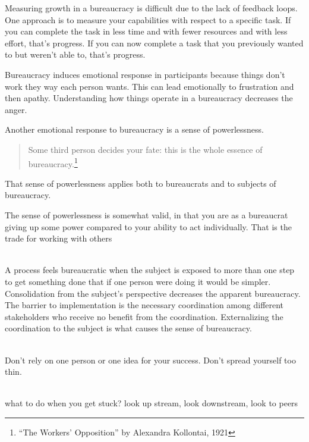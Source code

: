 Measuring growth in a bureaucracy is difficult due to the lack of feedback loops. One approach is to measure your capabilities with respect to a specific task. If you can complete the task in less time and with fewer resources and with less effort, that's progress. If you can now complete a task that you previously wanted to but weren't able to, that's progress.



Bureaucracy induces emotional response in participants because things don't work they way each person wants. This can lead emotionally to frustration and then apathy. Understanding how things operate in a bureaucracy decreases the anger.


Another emotional response to bureaucracy is a sense of powerlessness. 
\begin{quote}
Some third person decides your fate: this is the whole essence of bureaucracy.\footnote{``The Workers' Opposition'' by Alexandra Kollontai, 1921}
\end{quote}
That sense of powerlessness applies both to bureaucrats and to subjects of bureaucracy. 

The sense of powerlessness is somewhat valid, in that you are as a bureaucrat giving up some power compared to your ability to act individually. That is the trade for working with others

\ \\

A process feels bureaucratic when the subject is exposed to more than one step to get something done that if one person were doing it would be simpler. Consolidation from the subject's perspective decreases the apparent bureaucracy. The barrier to implementation is the necessary coordination among different stakeholders who receive no benefit from the coordination. Externalizing the coordination to the subject is what causes the sense of bureaucracy. 


\ \\

Don't rely on one person or one idea for your success. Don't spread yourself too thin. 

\ \\

what to do when you get stuck?
look up stream, look downstream, look to peers

